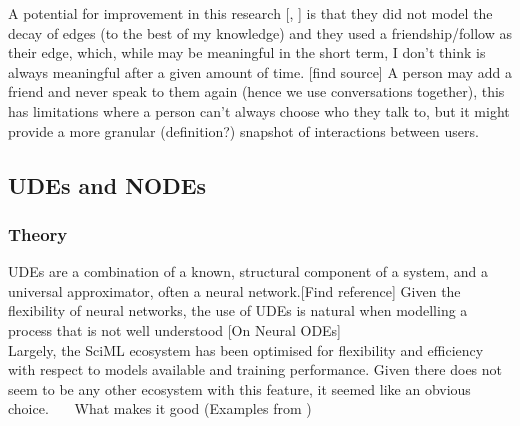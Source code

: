 \documentclass[12pt]{article}
\begin{document}
        A potential for improvement in this research [\cite{garg2009evolution}, \cite{zhao2012multi}] is that they did not model the decay of edges (to the best of my knowledge) and they used a friendship/follow as their edge, which, while may be meaningful in the short term, I don't think is always meaningful after a given amount of time. [find source] A person may add a friend and never speak to them again (hence we use conversations together), this has limitations where a person can't always choose who they talk to, but it might provide a more granular (definition?) snapshot of interactions between users.\\
    \subsection{UDEs and NODEs}
      \subsubsection{Theory}
         UDEs are a combination of a known, structural component of a system, and a universal approximator, often a neural network.[Find reference]
         Given the flexibility of neural networks, the use of UDEs is natural when modelling a process that is not well understood [On Neural ODEs]
         \\
         Largely, the SciML ecosystem has been optimised for flexibility and efficiency with respect to models available 
         and training performance. Given there does not seem to be any other ecosystem with this feature, it seemed like 
         an obvious choice. ~~~What makes it good (Examples from \cite{SciML_C_Rak})  \\
        
\end{document}
